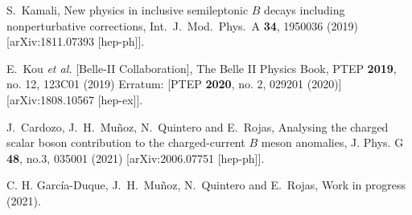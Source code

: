 \documentclass[reprint,showpacs,aps,prd,nofootinbib,superscriptaddress,longbibliography]{revtex4-1}
\begin{document}
\begin{thebibliography}{99}
S.~Kamali, New physics in inclusive semileptonic $B$ decays including nonperturbative corrections, Int.\ J.\ Mod.\ Phys.\ A {\bf 34}, 1950036 (2019) [arXiv:1811.07393 [hep-ph]].

E.~Kou {\it et al.} [Belle-II Collaboration], The Belle II Physics Book, PTEP {\bf 2019}, no. 12, 123C01 (2019)
Erratum: [PTEP {\bf 2020}, no. 2, 029201 (2020)]
[arXiv:1808.10567 [hep-ex]].
  
J.~Cardozo, J.~H.~Mu\~noz, N.~Quintero and E.~Rojas, Analysing the charged scalar boson contribution to the charged-current $B$ meson anomalies, J. Phys. G \textbf{48}, no.3, 035001 (2021)
[arXiv:2006.07751 [hep-ph]].

C. H. Garc\'{i}a-Duque, J.~H.~Mu\~noz, N.~Quintero and E.~Rojas, Work in progress (2021).
\end{thebibliography}
\end{document}
